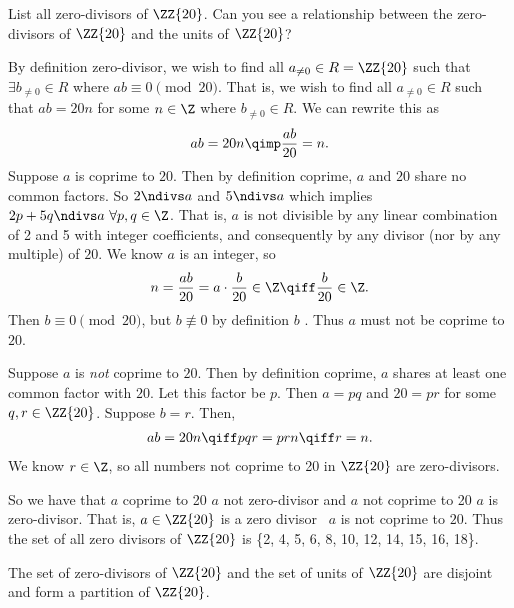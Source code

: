 \documentclass{article}
\begin{document}
List all zero-divisors of \( \ZZ{20} \). Can you see a relationship between the zero-divisors of \( \ZZ{20} \) and the units of \( \ZZ{20} \)?

\begin{solution} %
  By definition zero-divisor, we wish to find all \( a_{\neq 0}\in R = \ZZ{20} \) such that \( \exists b_{\neq 0} \in R \) where \( ab\equiv 0 \pmod{20} \).
  That is, we wish to find all \( a_{\neq 0} \in R \) such that \( ab = 20n \) for some \( n\in\Z \) where \( b_{\neq 0}\in R \).
  We can rewrite this as
  \begin{align*}
    ab = 20n \qimp \frac{ab}{20} = n.
  \end{align*}
  Suppose \( a \) is coprime to \( 20 \). Then by definition coprime, \( a \) and \( 20 \) share no common factors.
  So \( 2\ndivs a \) and \( 5\ndivs a \) which implies \( 2p+5q\ndivs a\ \forall p,q\in\Z \).
  That is, \( a \) is not divisible by any linear combination of 2 and 5 with integer coefficients, and consequently by any divisor (nor by any multiple) of \( 20 \). We know \( a \) is an integer, so \begin{align*}
    n = \frac{ab}{20} = a \cdot \frac{b}{20}\in\Z \qiff \frac{b}{20}\in\Z.
  \end{align*}
  Then \( b \equiv 0\pmod{20} \), but \( b\not\equiv 0 \) by definition \( b \) \contradiction. Thus \( a \) must not be coprime to \( 20 \).

  Suppose \( a \) is \emph{not} coprime to \( 20 \). Then by definition coprime, \( a \) shares at least one common factor with \( 20 \). Let this factor be \( p \). Then \( a = pq \) and \( 20 = pr \) for some \(q,r \in\ZZ{20} \). Suppose \( b = r \). Then, \begin{align*}
    ab = 20n \qiff pqr = prn \qiff r = n.
  \end{align*}
  We know \( r\in\Z \), so all numbers not coprime to 20 in \( \ZZ{20} \) are zero-divisors.

  So we have that \( a \) coprime to 20 \imp \( a \) not zero-divisor and \( a \) not coprime to 20 \imp \( a \) is zero-divisor. That is, \( a\in\ZZ{20} \) is a zero divisor \iff\ \( a \) is not coprime to \( 20 \). Thus the set of all zero divisors of \( \ZZ{20} \) is \{2, 4, 5, 6, 8, 10, 12, 14, 15, 16, 18\}.

  The set of zero-divisors of \( \ZZ{20} \) and the set of units of \( \ZZ{20} \) are disjoint and form a partition of \( \ZZ{20} \).
\end{solution}
\end{document}
